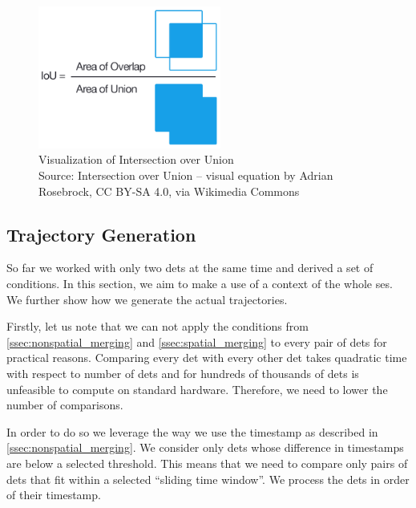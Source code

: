 \begin{figure}
    \centering
    \includegraphics[width=6cm]{img/Intersection_over_Union_-_visual_equation.png}
    \caption[Visualization of Intersection over Union]{Visualization of Intersection over Union\\Source: Intersection over Union -- visual equation\protect\footnotemark{} by Adrian Rosebrock, CC BY-SA 4.0,\footnotemark{} via Wikimedia Commons}
    \label{fig:iou}
\end{figure}
\addtocounter{footnote}{-2}


\subsection{Trajectory Generation}

\label{ssec:trajectory_generation}

So far we worked with only two \glspl{det} at the same time and derived a set of conditions. In this section, we aim to make a use of a context of the whole \gls{ses}. We further show how we generate the actual trajectories.

Firstly, let us note that we can not apply the conditions from \autoref{ssec:nonspatial_merging} and \autoref{ssec:spatial_merging} to every pair of \glspl{det} for practical reasons. Comparing every \gls{det} with every other \gls{det} takes quadratic time with respect to number of \glspl{det} and for hundreds of thousands of \glspl{det} is unfeasible to compute on standard hardware. Therefore, we need to lower the number of comparisons.

In order to do so we leverage the way we use the timestamp as described in \autoref{ssec:nonspatial_merging}. We consider only \glspl{det} whose difference in timestamps are below a selected threshold. This means that we need to compare only pairs of \glspl{det} that fit within a selected ``sliding time window''. We process the \glspl{det} in order of their timestamp.

